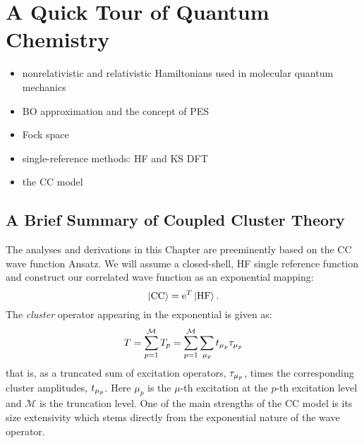 
\renewcommand{\thefigure}{\arabic{chapter}.\arabic{figure}}

\chapter{A Quick Tour of Quantum Chemistry}\label{ch:QM}

\begin{itemize}
  \item nonrelativistic and relativistic Hamiltonians used in molecular
    quantum mechanics
  \item \ac{BO} approximation and the concept of \ac{PES}
  \item Fock space
  \item single-reference methods: \ac{HF} and \ac{KS} \ac{DFT}
  \item the \ac{CC}  model
\end{itemize}

\pagebreak

\section{A Brief Summary of Coupled Cluster Theory}


The analyses and derivations in this Chapter are preeminently based
on the \acl{CC} wave function Ansatz.
We will assume a closed-shell, \acs{HF} single reference function and
construct our correlated wave function as an exponential mapping:
\begin{equation}
  \ket{\mathrm{CC}} = \mathrm{e}^{T}\ket{\mathrm{HF}}.
\end{equation}
The \emph{cluster} operator appearing in the exponential is given as:
\begin{equation}
  T = \sum_{p=1}^\mathcal{M} T_p = \sum_{p=1}^\mathcal{M}\sum_{\mu_p}t_{\mu_p}\tau_{\mu_p}
\end{equation}
that is, as a truncated sum of excitation operators, $\tau_{\mu_p}$,
times the corresponding cluster amplitudes, $t_{\mu_p}$.
Here $\mu_p$ is the $\mu$-th excitation at the $p$-th excitation level and
$\mathcal{M}$ is the truncation level.
One of the main strengths of the \acs{CC} model is its size extensivity
which stems directly from the exponential nature of the wave
operator.~\autocite{Shavitt2009-mr, Helgaker2000-tz}

